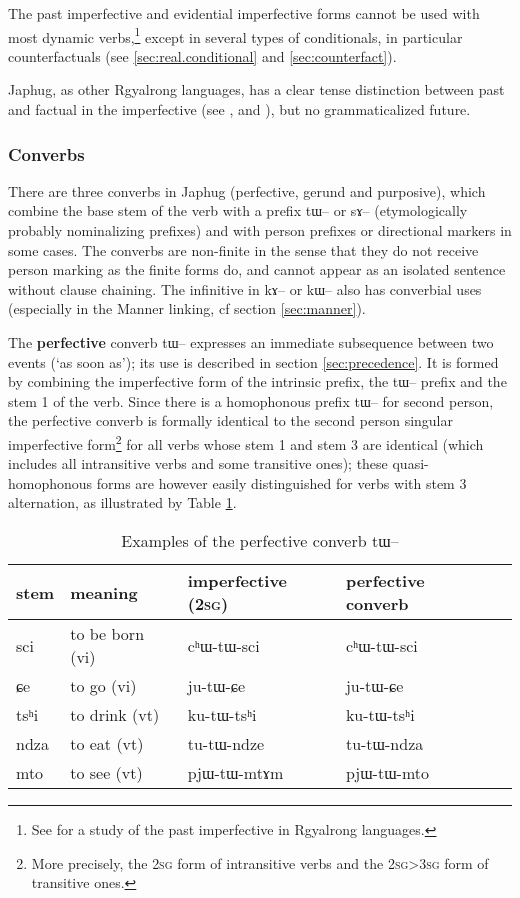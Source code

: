 \documentclass[oldfontcommands,oneside,a4paper,11pt]{article}
\newcommand{\ipa}[1]{{\phon \mbox{#1}}} %
\begin{document}
The past imperfective  and   evidential imperfective forms cannot be used with most dynamic verbs,\footnote{ See \citealt{lin11direction} for a study of the past imperfective in Rgyalrong languages. } except in    several types of conditionals, in particular counterfactuals (see \ref{sec:real.conditional} and \ref{sec:counterfact}). 
  
 Japhug, as other Rgyalrong languages, has a clear tense distinction between past and factual in the imperfective (see \citealt{jackson00puxi}, \citealt{linyj03tense} and \citealt[371-392]{jacques04these}), but no grammaticalized future. 
  
\subsubsection{Converbs} \label{sec:converbs}
 There are three converbs in Japhug (perfective, gerund and purposive), which combine the base stem of the verb with a  prefix \ipa{tɯ--} or \ipa{sɤ--} (etymologically probably nominalizing prefixes) and with person prefixes or directional markers in some cases. The converbs are non-finite in the sense that they do not receive person marking as the finite forms do, and cannot appear as an isolated sentence without clause chaining. The infinitive in \ipa{kɤ--} or \ipa{kɯ--} also has converbial uses (especially in the Manner linking, cf section \ref{sec:manner}).
 
 
The \textbf{perfective} converb \ipa{tɯ}-- expresses an immediate subsequence between two events (`as soon as'); its use is described in section \ref{sec:precedence}. It is formed by combining the  imperfective form of the intrinsic prefix, the \ipa{tɯ}-- prefix and the stem 1 of the verb. Since there is a homophonous prefix \ipa{tɯ}-- for second person, the perfective converb is formally identical to the second person singular imperfective form\footnote{More precisely, the \textsc{2sg} form of intransitive verbs and the \textsc{2sg>3sg} form of transitive ones. } for all verbs whose stem 1 and stem 3 are identical (which includes all intransitive verbs and some transitive ones); these quasi-homophonous forms are however easily distinguished for verbs with stem 3 alternation, as illustrated by  Table  \ref{tab:pfv.converb}.

\begin{table}[h]
\caption{Examples of the perfective converb \ipa{tɯ}--} \label{tab:pfv.converb}
\begin{tabular}{lllll}
\toprule
stem & meaning &imperfective (\textsc{2sg}) & perfective converb \\
\midrule
\ipa{sci} & to be born (vi) & \ipa{cʰɯ-tɯ-sci} &  \ipa{cʰɯ-tɯ-sci}\\
\ipa{ɕe} & to go (vi) & \ipa{ju-tɯ-ɕe} & \ipa{ju-tɯ-ɕe} \\
\ipa{tsʰi} & to drink (vt) & \ipa{ku-tɯ-tsʰi} & \ipa{ku-tɯ-tsʰi}  \\
\midrule
\ipa{ndza} & to eat (vt) & \ipa{tu-tɯ-ndze} &  \ipa{tu-tɯ-ndza}\\
\ipa{mto} & to see (vt)& \ipa{pjɯ-tɯ-mtɤm} &  \ipa{pjɯ-tɯ-mto}\\
\bottomrule
\end{tabular}
\end{table}
\end{document}
